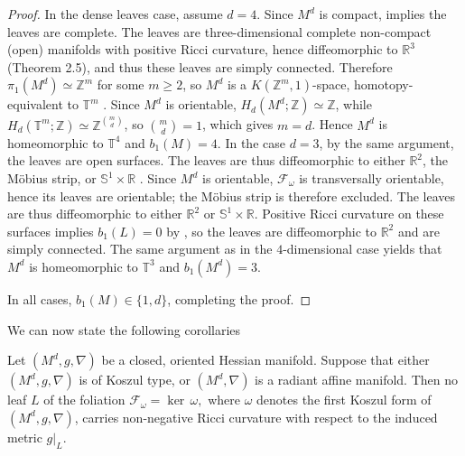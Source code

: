 \begin{proof}
In the dense leaves case, assume $d = 4$. Since $M^d$ is compact, \citep[Exercise~10.4.28]{conlon2001}
 implies the leaves are complete. The leaves are three-dimensional complete non-compact (open) manifolds with positive Ricci curvature, 
 hence diffeomorphic to $\mathbb{R}^3$ \citep{shi1989} (Theorem 2.5), and thus these leaves are simply connected. 
 Therefore $\pi_1(M^d) \simeq \mathbb{Z}^m$ for some $m \ge 2$, so $M^d$ is a $K(\mathbb{Z}^m,1)$-space, homotopy-equivalent
  to $\mathbb{T}^m$ \citep[p.~49]{godbillon1991}. Since $M^d$ is orientable, $H_d(M^d;\mathbb{Z}) \simeq \mathbb{Z}$, 
  while $H_d(\mathbb{T}^m;\mathbb{Z}) \simeq \mathbb{Z}^{\binom{m}{d}}$, so $\binom{m}{d} = 1$, which gives $m = d$.
   Hence $M^d$ is homeomorphic to $\mathbb{T}^4$ and $b_1(M) = 4$. In the case $d = 3$, by the same argument,
    the leaves are open surfaces. The leaves are thus diffeomorphic to either $\mathbb{R}^2$, the M\"obius strip, 
    or $\mathbb{S}^1 \times \mathbb{R}$ \citep[p.~49]{godbillon1991}. Since $M^d$ is orientable, $\mathcal{F}_\omega$ is transversally 
    orientable, hence its leaves are orientable; the M\"obius strip is therefore excluded. The leaves are thus diffeomorphic to either
     $\mathbb{R}^2$ or $\mathbb{S}^1 \times \mathbb{R}$. Positive Ricci curvature on these surfaces implies $b_1(L) = 0$ by 
     \citep{anderson1990}, so the leaves are diffeomorphic to $\mathbb{R}^2$ and are simply connected. The same argument as in the $4$-dimensional case yields that $M^d$ is homeomorphic to $\mathbb{T}^3$ and $b_1(M^d) = 3$.

\medskip
In all cases, $b_1(M) \in \{1, d\}$, completing the proof.
\end{proof}

We can now state the following corollaries

\begin{cor}\label{cor:no-nonneg-ricci}
Let $(M^d, g, \nabla)$ be a closed, oriented Hessian manifold. 
Suppose that either $(M^d, g, \nabla)$ is of Koszul type, or 
$(M^d, \nabla)$ is a radiant affine manifold. Then no leaf $L$ 
of the foliation $\mathcal{F}_\omega=\ker\,\omega,$
where $\omega$ denotes the first Koszul form of $(M^d, g, \nabla)$, 
carries non-negative Ricci curvature with respect to the induced 
metric $g|_L$.
\end{cor}

